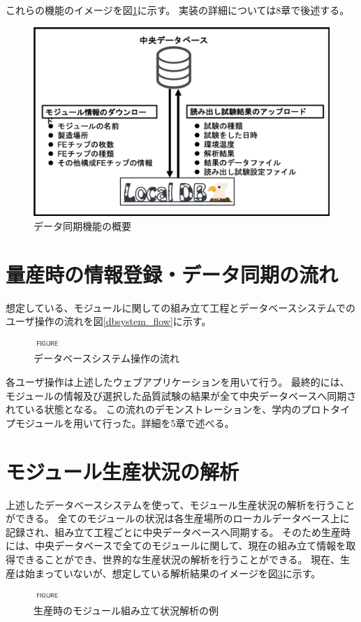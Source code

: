 これらの機能のイメージを図\ref{interface_overview}に示す。
実装の詳細については8章で後述する。

\begin{figure}[bpt]\centering
\includegraphics[width=12cm]{interface_overview}
\caption[データ同期機能の概要]{データ同期機能の概要}
\label{interface_overview}
\end{figure}

\newpage
\section{量産時の情報登録・データ同期の流れ}
想定している、モジュールに関しての組み立て工程とデータベースシステムでのユーザ操作の流れを図\ref{dbsystem_flow}に示す。

\begin{figure}[bpt]\centering
\includegraphics[width=1cm]{figure}
\caption[データベースシステム操作の流れ]{データベースシステム操作の流れ}
\label{webapp_sign_off}
\end{figure}

各ユーザ操作は上述したウェブアプリケーションを用いて行う。
最終的には、モジュールの情報及び選択した品質試験の結果が全て中央データベースへ同期されている状態となる。
この流れのデモンストレーションを、学内のプロトタイプモジュールを用いて行った。詳細を5章で述べる。

\section{モジュール生産状況の解析}
上述したデータベースシステムを使って、モジュール生産状況の解析を行うことができる。
全てのモジュールの状況は各生産場所のローカルデータベース上に記録され、組み立て工程ごとに中央データベースへ同期する。
そのため生産時には、中央データベースで全てのモジュールに関して、現在の組み立て情報を取得できることができ、世界的な生産状況の解析を行うことができる。
現在、生産は始まっていないが、想定している解析結果のイメージを図\ref{production_analysis}に示す。

\begin{figure}[bpt]\centering
\includegraphics[width=1cm]{figure}
\caption[生産時のモジュール組み立て状況解析の例]{生産時のモジュール組み立て状況解析の例}
\label{production_analysis}
\end{figure}

